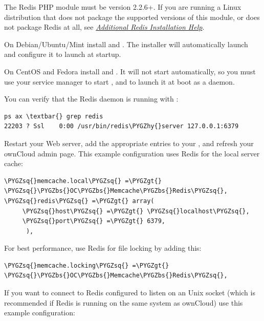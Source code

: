 \documentclass[letterpaper,10pt,english]{sphinxmanual}
\def\PYGZbs{\char`\\}
\def\PYGZgt{\char`\>}
\def\PYGZhy{\char`\-}
\def\PYGZsq{\char`\'}
\renewcommand\PYGZsq{\textquotesingle}
\begin{document}
The Redis PHP module must be version 2.2.6+. If you are running a Linux
distribution that does not package the supported versions of this module, or
does not package Redis at all, see {\hyperref[configuration_server/caching_configuration:install\string-redis\string-label]{\emph{Additional Redis Installation Help}}}.

On Debian/Ubuntu/Mint install  and . The installer
will automatically launch  and configure it to launch at
startup.

On CentOS and Fedora install  and . It will not
start automatically, so you must use your service manager to start
, and to launch it at boot as a daemon.

You can verify that the Redis daemon is running with :

\begin{Verbatim}[commandchars=\\\{\}]
ps ax \textbar{} grep redis
22203 ? Ssl    0:00 /usr/bin/redis\PYGZhy{}server 127.0.0.1:6379
\end{Verbatim}

Restart your Web server, add the appropriate entries to your , and
refresh your ownCloud admin page. This example  configuration uses
Redis for the local server cache:

\begin{Verbatim}[commandchars=\\\{\}]
\PYGZsq{}memcache.local\PYGZsq{} =\PYGZgt{} \PYGZsq{}\PYGZbs{}OC\PYGZbs{}Memcache\PYGZbs{}Redis\PYGZsq{},
\PYGZsq{}redis\PYGZsq{} =\PYGZgt{} array(
     \PYGZsq{}host\PYGZsq{} =\PYGZgt{} \PYGZsq{}localhost\PYGZsq{},
     \PYGZsq{}port\PYGZsq{} =\PYGZgt{} 6379,
      ),
\end{Verbatim}

For best performance, use Redis for file locking by adding this:

\begin{Verbatim}[commandchars=\\\{\}]
\PYGZsq{}memcache.locking\PYGZsq{} =\PYGZgt{} \PYGZsq{}\PYGZbs{}OC\PYGZbs{}Memcache\PYGZbs{}Redis\PYGZsq{},
\end{Verbatim}

If you want to connect to Redis configured to listen on an Unix socket (which is
recommended if Redis is running on the same system as ownCloud) use this example
 configuration:
\end{document}
